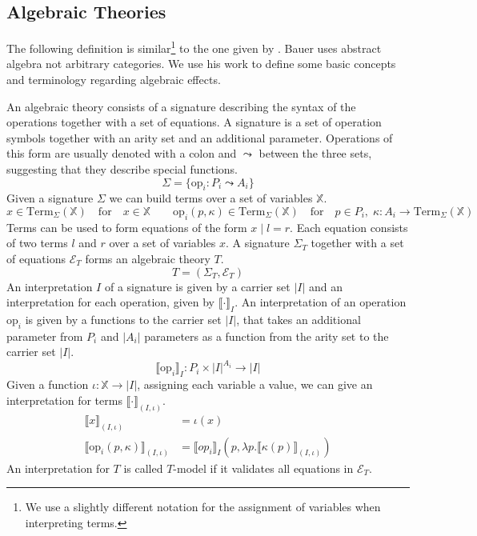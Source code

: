 \subsection{Algebraic Theories}

The following definition is similar\footnote{We use a slightly different
  notation for the assignment of variables when interpreting terms.} to the one
given by \textcite{DBLP:journals/corr/abs-1807-05923}.
Bauer uses abstract algebra not arbitrary categories.
We use his work to define some basic concepts and terminology regarding
algebraic effects.

An algebraic theory consists of a signature describing the syntax of the
operations together with a set of equations.
A signature is a set of operation symbols together with an arity set and an
additional parameter.
Operations of this form are usually denoted with a colon and $\leadsto$
between the three sets, suggesting that they describe special functions.
\[
  \Sigma = \{ \mathrm{op}_i : P_i \leadsto A_i  \}
\]
Given a signature $\Sigma$ we can build terms over a set of variables $\mathbb{X}$.
\[
  x \in \mathrm{Term}_\Sigma(\mathbb{X}) \quad\text{for}\quad x\in\mathbb{X} \qquad
  \mathrm{op}_i(p, \kappa) \in \mathrm{Term}_\Sigma(\mathbb{X}) \quad\text{for}\quad
  p\in P_i,\;\kappa : A_i \rightarrow \mathrm{Term}_\Sigma(\mathbb{X})
\]
Terms can be used to form equations of the form $x\;|\;l=r$.
Each equation consists of two terms $l$ and $r$ over a set of variables $x$.
A signature $\Sigma_T$ together with a set of equations $\mathcal{E}_T$ forms an
algebraic theory $T$.
\[
  T = (\Sigma_T, \mathcal{E}_T)
\]
An interpretation $I$ of a signature is given by a carrier set $|I|$ and an
interpretation for each operation, given by $\lBrack\cdot\rBrack_I$.
An interpretation of an operation $\mathrm{op}_i$ is given by a functions to the
carrier set $|I|$, that takes an additional parameter from $P_i$ and $|A_i|$
parameters as a function from the arity set to the carrier set $|I|$.
\[
  \lBrack \mathrm{op}_i \rBrack_I : P_i \times |I|^{A_i} \rightarrow |I|
\]
Given a function $\iota : \mathbb{X} \rightarrow |I|$, assigning each variable
a value, we can give an interpretation for terms $\lBrack\cdot\rBrack_{(I,\iota)}$.
\begin{align*} \lBrack x \rBrack_{(I,\iota)} &= \iota(x) \\
  \lBrack \mathrm{op}_i(p, \kappa)\rBrack_{(I,\iota)} &= \lBrack op_i \rBrack_I (p, \lambda p. \lBrack\kappa(p)\rBrack_{(I, \iota)})
\end{align*}
An interpretation for $T$ is called $T$-model if it validates all equations in $\mathcal{E}_T$.

